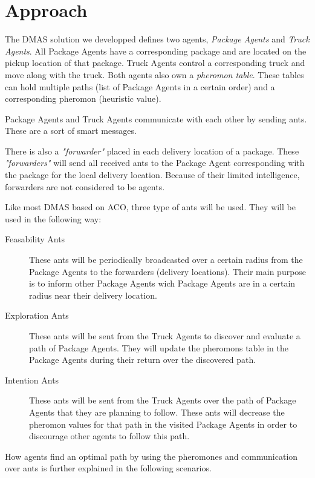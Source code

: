 \section{Approach}
\label{sec:approach}

The DMAS solution we developped defines two agents, \emph{Package Agents} and
\emph{Truck Agents}. All Package Agents have a corresponding package and are
located on the pickup location of that package. Truck Agents control a
corresponding truck and move along with the truck. Both agents also own a
\emph{pheromon table}. These tables can hold multiple paths (list of Package
Agents in a certain order) and a corresponding pheromon (heuristic value).

\npar Package Agents and Truck Agents communicate with each other by sending
ants. These are a sort of smart messages.

\npar There is also a \emph{"forwarder"} placed in each delivery location of a
package. These \emph{"forwarders"} will send all received ants to the Package
Agent corresponding with the package for the local delivery location. Because of
their limited intelligence, forwarders are not considered to be agents.

\npar Like most DMAS based on ACO, three type of ants will be used. They will be
used in the following way:

\begin{description}
	\item[Feasability Ants] These ants will be periodically broadcasted
	over a certain radius from the Package Agents to the forwarders (delivery
	locations). Their main purpose is to inform other Package Agents wich Package
	Agents are in a certain radius near their delivery location.

	\item[Exploration Ants] These ants will be sent from the Truck Agents
	to discover and evaluate a path of Package Agents. They will update the
	pheromons table in the Package Agents during their return over the discovered
	path.
	
	\item[Intention Ants] These ants will be sent from the Truck Agents
	over the path of Package Agents that they are planning to follow. These ants
	will decrease the pheromon values for that path in the visited Package Agents
	in order to discourage other agents to follow this path.
\end{description}

\npar How agents find an optimal path by using the pheromones and communication
over ants is further explained in the following scenarios.

